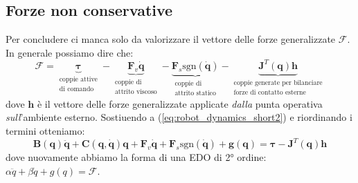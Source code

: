 \subsection{Forze non conservative}
Per concludere ci manca solo da valorizzare il vettore delle forze generalizzate $\bm{\mathcal{F}}$. In generale possiamo dire che:
$$
\bm{\mathcal{F}}
=
\underbrace{\bm{\tau}}_{\substack{\text{coppie attive} \\ \text{di comando}}}
-
\underbrace{\bm{F}_v\dot{\bm{q}}}_{\substack{\text{coppie di} \\ \text{attrito viscoso}}}
-
\underbrace{\bm{F}_s \text{sgn}(\dot{\bm{q}}) }_{\substack{\text{coppie di} \\ \text{attrito statico}}}
-
\underbrace{\bm{J}^T(\bm{q}) \bm{h}}_{\substack{\text{coppie generate per bilanciare} \\ \text{forze di contatto esterne}}}
$$
dove $\bm{h}$ è il vettore delle forze generalizzate applicate \textit{dalla} punta operativa \textit{sull}’ambiente esterno.
Sostiuendo a (\ref{eq:robot_dynamics_short2}) e riordinando i termini otteniamo:
\begin{equation}\label{eq:dynamic_complete}
	\boxed{
		\bm{B}(\bm{q})\bm{\ddot{q}} + \bm{C}(\bm{q}, \bm{\dot{q}})\bm{q}		+
		\bm{F}_v\dot{\bm{q}} 
		+
		\bm{F}_s \text{sgn}(\dot{\bm{q}})
		+
		\bm{g}(\bm{q})
		= 
		\bm{\tau}
		-
		\bm{J}^T(\bm{q}) \bm{h}
	}
\end{equation}
dove nuovamente abbiamo la forma di una EDO di 2° ordine: $\alpha\ddot{q} + \beta \dot{q} + g(q) = \mathcal{F}$.
